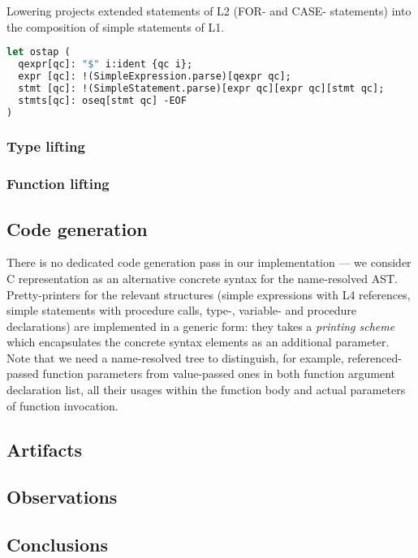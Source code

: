 Lowering projects extended statements of L2 (FOR- and CASE- statements) into the composition
of simple statements of L1. 

\begin{lstlisting}[language=ocaml]
let ostap (
  qexpr[qc]: "$" i:ident {qc i};
  expr [qc]: !(SimpleExpression.parse)[qexpr qc];
  stmt [qc]: !(SimpleStatement.parse)[expr qc][expr qc][stmt qc];
  stmts[qc]: oseq[stmt qc] -EOF
)
\end{lstlisting}

\subsubsection{Type lifting}


\subsubsection{Function lifting}



\subsection{Code generation}

There is no dedicated code generation pass in our implementation --- we consider C representation
as an alternative concrete syntax for the name-resolved AST. Pretty-printers for the relevant
structures (simple expressions with L4 references, simple statements with procedure calls, 
type-, variable- and procedure declarations) are implemented in a generic form: they takes a
\emph{printing scheme} which encapsulates the concrete syntax elements as an additional
parameter. Note that we need a name-resolved tree to distinguish, for example, referenced-passed
function parameters from value-passed ones in both function argument declaration list, all
their usages within the function body and actual parameters of function invocation.

\subsection{Artifacts}

\subsection{Observations}

\subsection{Conclusions}
